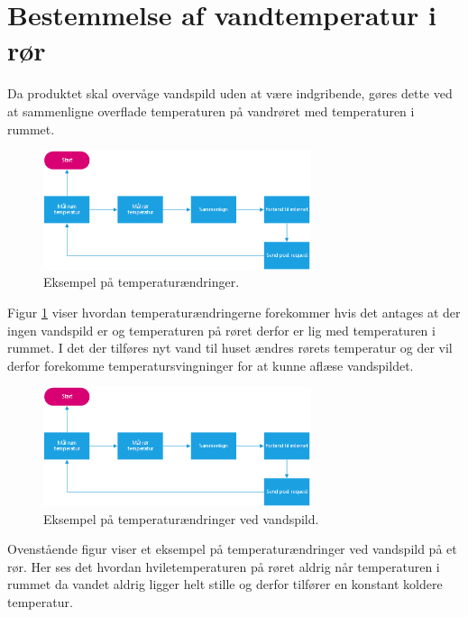 \section{Bestemmelse af vandtemperatur i rør}
Da produktet skal overvåge vandspild uden at være indgribende, gøres dette ved at sammenligne overflade temperaturen på vandrøret med temperaturen i rummet. 

\begin{figure}[h!]
  \centering
  \includegraphics[width=0.7\textwidth]{figures/Fase2software.png}
  \caption{Eksempel på temperaturændringer.}
  \label{tempgraf_eksempel1}
\end{figure}



Figur \ref{tempgraf_eksempel1} viser hvordan temperaturændringerne forekommer hvis det antages at der ingen vandspild er og temperaturen på røret derfor er lig med temperaturen i rummet. I det der tilføres nyt vand til huset ændres rørets temperatur og der vil derfor forekomme temperatursvingninger for at kunne aflæse vandspildet.





\begin{figure}[h!]
  \centering
  \includegraphics[width=0.7\textwidth]{figures/Fase2software.png}
  \caption{Eksempel på temperaturændringer ved vandspild.}
  \label{tempgraf_eksempelspild}
\end{figure}


Ovenstående figur viser et eksempel på temperaturændringer ved vandspild på et rør. Her ses det hvordan hviletemperaturen på røret aldrig når temperaturen i rummet da vandet aldrig ligger helt stille og derfor tilfører en konstant koldere temperatur.  



    